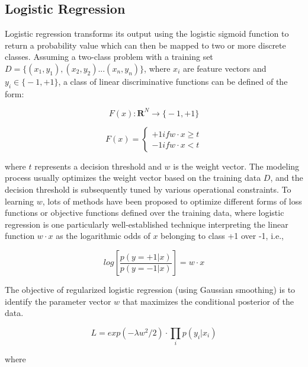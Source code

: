\documentclass[sigconf]{acmart}
\begin{document}
\subsection{Logistic Regression}
\label{subsection:logistic}

Logistic regression \cite{harrell2001ordinal} transforms its output using the logistic sigmoid function to return a probability value which can then be mapped to two or more discrete classes. Assuming a two-class problem with a training set $D = \big\{ (x_1, y_1), (x_2, y_2)...(x_n, y_n) \big\} $, where $x_i$ are feature vectors and $y_i \in \big\{ -1, +1 \big\}$, a class of linear discriminative functions can be defined of the form:

\begin{equation}
F(x): \mathbf{R}^N \rightarrow \big\{ -1, +1 \big\}
\end{equation}

\begin{equation}
F(x) = \begin{cases}
    +1 if w \cdot x \geq t \\
        -1 if w \cdot x < t 
    \end{cases}
\end{equation}

where $t$ represents a decision threshold and $w$ is the weight vector. The modeling process usually optimizes the weight vector based on the training data $D$, and the decision threshold is subsequently tuned by various operational constraints. To learning $w$, lots of methods have been proposed to optimize different forms of loss functions or objective functions defined over the training data, where logistic regression is one particularly well-established technique interpreting the linear function $w \cdot x$ as the logarithmic odds of $x$ belonging to class +1 over -1, i.e., 

\begin{equation}
log[\frac{p(y=+1|x)}{p(y=-1|x)}] = w \cdot x
\end{equation}

The objective of regularized logistic regression (using Gaussian smoothing) is to identify the parameter vector $w$ that maximizes the conditional posterior of the data.

\begin{equation}
L = exp(-\lambda w^2 /2) \cdot \prod_i p( y_i | x_i )
\end{equation}

where 
\end{document}
